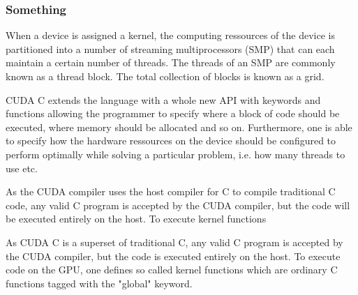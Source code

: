 \subsubsection{Something}

When a device is assigned a kernel, the computing ressources of the device is partitioned into a number of streaming multiprocessors (SMP) that can each maintain a certain number of threads. The threads of an SMP are  commonly known as a thread block. The total collection of blocks is known as a grid. 

CUDA C extends the language with a whole new API with keywords and functions allowing the programmer to specify where a block of code should be executed, where memory should be allocated and so on. Furthermore, one is able to specify how the hardware ressources on the device should be configured to perform optimally while solving a particular problem, i.e. how many threads to use etc.



As the CUDA compiler uses the host compiler for C to compile traditional C code, any valid C program is accepted by the CUDA compiler, but the code will be executed entirely on the host. To execute kernel functions 


As CUDA C is a superset of traditional C, any valid C program is accepted by the CUDA compiler, but the code is executed entirely on the host. To execute code on the GPU, one defines so called kernel functions which are ordinary C functions tagged with the "global" keyword.